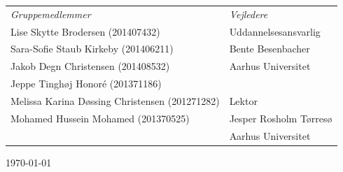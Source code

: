 \begin{titlingpage}
\begin{table}[h]
    \centering
    \begin{tabular}{p{8cm} p{5cm}}
        \textit{Gruppemedlemmer} & \textit{Vejledere} \\
        Lise Skytte Brodersen (201407432)	  & Uddannelsesansvarlig   \\
        Sara-Sofie Staub Kirkeby (201406211)   & Bente Besenbacher  \\
        Jakob Degn Christensen (201408532)  & Aarhus Universitet   \\
        Jeppe Tinghøj Honoré (201371186)   &   \\
        Melissa Karina Døssing Christensen (201271282) & Lektor\\
        Mohamed Hussein Mohamed (201370525)   & Jesper Rosholm Tørresø \\
        	&	Aarhus Universitet \\
    \end{tabular}
\end{table}



\vfill

\begin{center}
{\large \today}
\end{center}


\end{titlingpage}
